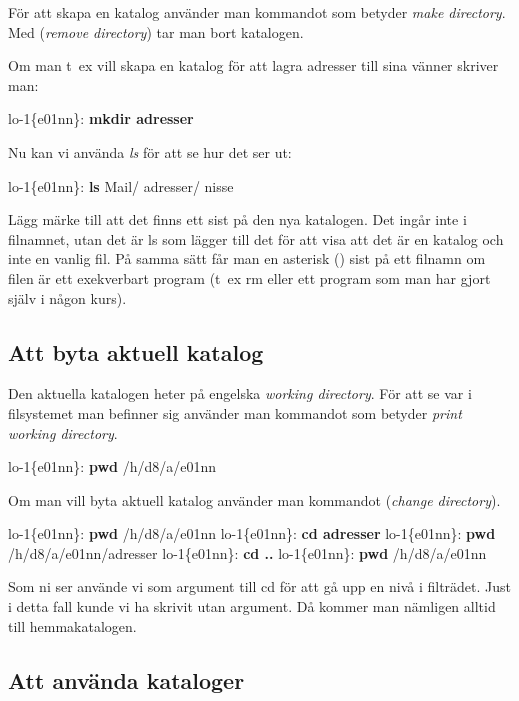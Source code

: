 \documentclass[a4paper,twocolumn]{book}
\begin{document}
För att skapa en katalog använder man kommandot
 som betyder \emph{make directory}. Med 
(\emph{remove directory}) tar man bort katalogen.

Om man t~ex vill skapa en katalog för att lagra adresser till sina
vänner skriver man:
\begin{example}
lo-1\{e01nn\}: \textbf{mkdir adresser}
\end{example}
Nu kan vi använda \emph{ls} för att se hur det ser ut:
\begin{example}
lo-1\{e01nn\}: \textbf{ls}
Mail/      adresser/  nisse
\end{example}
Lägg märke till att det finns ett
\hidettindex{/} sist på den nya katalogen. Det
ingår inte i filnamnet, utan det är ls som lägger till det för att
visa att det är en katalog och inte en vanlig fil. På samma sätt får
man en asterisk (\ttindex{*}) sist på ett filnamn om filen är
ett exekverbart program (t~ex rm eller ett program som man har gjort själv i
någon kurs).

\subsection{Att byta aktuell katalog}

Den aktuella katalogen
heter på engelska \emph{working directory}. För att se var i
filsystemet man befinner sig använder man kommandot  som
betyder \emph{print working directory}.
\begin{example}
lo-1\{e01nn\}: \textbf{pwd}
/h/d8/a/e01nn
\end{example}

Om man vill byta aktuell katalog använder man kommandot 
(\emph{change directory}).
\begin{example}
lo-1\{e01nn\}: \textbf{pwd}
/h/d8/a/e01nn
lo-1\{e01nn\}: \textbf{cd adresser}
lo-1\{e01nn\}: \textbf{pwd}
/h/d8/a/e01nn/adresser
lo-1\{e01nn\}: \textbf{cd ..}
lo-1\{e01nn\}: \textbf{pwd}
/h/d8/a/e01nn
\end{example}
Som ni ser använde vi  som argument till cd för att gå upp en
nivå i filträdet. Just i detta fall kunde vi ha skrivit  utan
argument. Då kommer man nämligen alltid till hemmakatalogen.

\subsection{Att använda kataloger}
\end{document}

